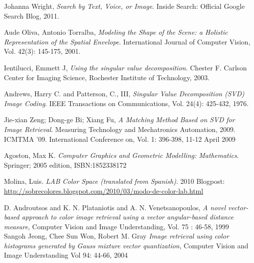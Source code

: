 \documentclass{report}
\begin{document}
\begin{thebibliography}{6}

  Johanna Wright,
  \emph{Search by Text, Voice, or Image}.
  Inside Search: Official Google Search Blog,
  2011.
  
  Aude Oliva, Antonio Torralba,
  \emph{	Modeling the Shape of the Scene: a Holistic Representation of the Spatial Envelope}.
  International Journal of Computer Vision, 
  Vol. 42(3): 145-175, 
  2001.

  Ientilucci, Emmett J,
  \emph{Using the singular value decomposition}. 
  Chester F. Carlson Center for Imaging Science,
  Rochester Institute of Technology,
  2003.

  Andrews, Harry C. and Patterson, C., III,
  \emph{ Singular Value Decomposition (SVD) Image Coding}.
  IEEE Transactions on Communications,
  Vol. 24(4): 425-432,
  1976.

  Jie-xian Zeng; Dong-ge Bi; Xiang Fu,
  \emph{A Matching Method Based on SVD for Image Retrieval}.
  Measuring Technology and Mechatronics Automation, 2009. ICMTMA '09. International Conference on, 
  Vol. 1: 396-398, 
  11-12 April 2009
  
  Agoston, Max K.
  \emph{Computer Graphics and Geometric Modelling: Mathematics}.
  Springer; 2005 edition,
  ISBN:1852338172
  
  Molina, Luis.
  \emph{LAB Color Space (translated from Spanish)}.
  2010 Blogpost: \url{http://sobrecolores.blogspot.com/2010/03/modo-de-color-lab.html}
  
    D. Androutsos and K. N. Plataniotis and A. N. Venetsanopoulos,
    \emph{A novel vector-based approach to color image retrieval using a vector angular-based distance measure},
    Computer Vision and Image Understanding,
    Vol. 75 : 46-58,
    1999
	Sangoh Jeong, Chee Sun Won, Robert M. Gray
	\emph{Image retrieval using color histograms generated by Gauss mixture vector quantization},
	Computer Vision and Image Understanding 
	Vol 94: 44-66,
	2004

\end{thebibliography}
\end{document}
